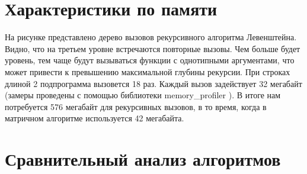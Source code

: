 \documentclass[12pt,a4paper]{report}
\begin{document}
\begin{figure}[ht!]
\end{figure}

\section{Характеристики по памяти}

На рисунке  представлено дерево вызовов рекурсивного алгоритма Левенштейна.
Видно, что на третьем уровне встречаются повторные вызовы. 
Чем больше будет уровень, тем чаще будут вызываться функции с однотипными аргументами, что может привести к превышению максимальной глубины рекурсии. 
При строках длиной 2 подпрограмма вызовется 18 раз. 
Каждый вызов задействует 32 мегабайт (замеры проведены с помощью  библиотеки memory\_profiler ).
В итоге нам потребуется 576 мегабайт для рекурсивных вызовов, в то время, когда в матричном алгоритме используется 42 мегабайта. 


\begin{figure}[ht!]
\end{figure}

\section{Сравнительный анализ алгоритмов}
\end{document}
